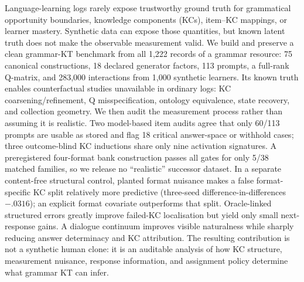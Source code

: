 Language-learning logs rarely expose trustworthy ground truth for grammatical
opportunity boundaries, knowledge components (KCs), item--KC mappings, or
learner mastery.  Synthetic data can expose those quantities, but known latent
truth does not make the observable measurement valid.  We build and preserve a
clean grammar-KT benchmark from all 1,222 records of a grammar resource: 75
canonical constructions, 18 declared generator factors, 113 prompts, a
full-rank Q-matrix, and 283,000 interactions from 1,000 synthetic learners.
Its known truth enables counterfactual studies unavailable in ordinary logs:
KC coarsening/refinement, Q misspecification, ontology equivalence, state
recovery, and collection geometry.  We then audit the measurement process
rather than assuming it is realistic.  Two model-based item audits agree that
only 60/113 prompts are usable as stored and flag 18 critical answer-space or
withhold cases; three outcome-blind KC inductions share only nine activation
signatures.  A preregistered four-format bank construction passes all gates for
only 5/38 matched families, so we release no ``realistic'' successor dataset.
In a separate content-free structural control, planted format nuisance makes a
false format-specific KC split relatively more predictive (three-seed
difference-in-differences $-.0316$); an explicit format covariate outperforms
that split.  Oracle-linked structured errors greatly improve failed-KC
localisation but yield only small next-response gains.  A dialogue continuum
improves visible naturalness while sharply reducing answer determinacy and KC
attribution.  The resulting contribution is not a synthetic human clone: it is
an auditable analysis of how KC structure, measurement nuisance, response
information, and assignment policy determine what grammar KT can infer.
